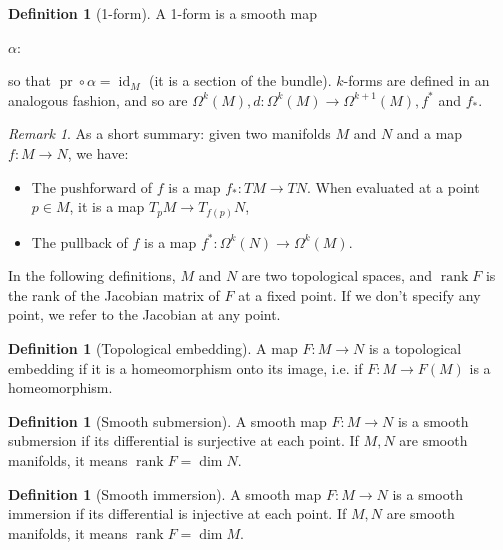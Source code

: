 \documentclass[a4paper,11pt,titlepage, article, oneside]{memoir}
\numberwithin{equation}{section}
\theoremstyle{definition}
\newtheorem{definition}[theorem]{Definition}
\theoremstyle{remark}
\newtheorem{remark}[theorem]{Remark}
\DeclareMathOperator{\id}{id}
\DeclareMathOperator{\rank}{rank}
\DeclareMathOperator{\pr}{pr}
\begin{document}
\begin{definition}[1-form]
A 1-form is a smooth map 
\begin{center}
$\alpha \colon$
\end{center}
so that $\pr \circ \alpha = \id_M$ (it is a section of the bundle). $k$-forms are defined in an analogous fashion, and so are $\Omega^k(M), d \colon \Omega^k(M) \rightarrow \Omega^{k+1}(M), f^*$ and $f_*$.
\end{definition}

\begin{remarkbox} \begin{remark}
As a short summary: given two manifolds $M$ and $N$ and a map $f \colon M \rightarrow N$, we have:
\begin{itemize}
\item The pushforward of $f$ is a map $f_* \colon TM \rightarrow TN$. When evaluated at a point $p \in M$, it is a map $T_p M \rightarrow T_{f(p)}N$,
\item The pullback of $f$ is a map $f^* \colon \Omega^k(N) \rightarrow \Omega^k(M)$.
\end{itemize}
\end{remark} \end{remarkbox}

In the following definitions, $M$ and $N$ are two topological spaces, and $\rank F$ is the rank of the Jacobian matrix of $F$ at a fixed point. If we don't specify any point, we refer to the Jacobian at any point.

\begin{definition}[Topological embedding]
A map $F\colon M \rightarrow N$ is a topological embedding if it is a homeomorphism onto its image, i.e. if $F\colon M \rightarrow F(M)$ is a homeomorphism.
\end{definition}

\begin{definition}[Smooth submersion] \label{smoothsubm}
A smooth map $F\colon M \rightarrow N$ is a smooth submersion if its differential is surjective at each point. If $M, N$ are smooth manifolds, it means $\rank F = \dim N$.
\end{definition}

\begin{definition}[Smooth immersion]
A smooth map $F \colon M \rightarrow N$ is a smooth immersion if its differential is injective at each point. If $M, N$ are smooth manifolds, it means $\rank F = \dim M$.
\end{definition}
\end{document}
